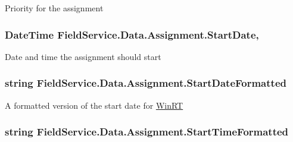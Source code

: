 Priority for the assignment 

\hypertarget{class_field_service_1_1_data_1_1_assignment_a1760d94888dee49e2e13aac039540d23}{
\subsubsection[{Start\+Date}]{\setlength{\rightskip}{0pt plus 5cm}Date\+Time Field\+Service.\+Data.\+Assignment.\+Start\+Date\hspace{0.3cm}{\ttfamily [get]}, {\ttfamily [set]}}}\label{class_field_service_1_1_data_1_1_assignment_a1760d94888dee49e2e13aac039540d23}


Date and time the assignment should start 

\hypertarget{class_field_service_1_1_data_1_1_assignment_a84d7b88bc21fba7b77d0f3924ae66c32}{
\subsubsection[{Start\+Date\+Formatted}]{\setlength{\rightskip}{0pt plus 5cm}string Field\+Service.\+Data.\+Assignment.\+Start\+Date\+Formatted\hspace{0.3cm}{\ttfamily [get]}}}\label{class_field_service_1_1_data_1_1_assignment_a84d7b88bc21fba7b77d0f3924ae66c32}


A formatted version of the start date for \hyperlink{namespace_field_service_1_1_win_r_t}{Win\+R\+T} 

\hypertarget{class_field_service_1_1_data_1_1_assignment_a02c811e84c8dd8876e6e0a9b4f4981d2}{
\subsubsection[{Start\+Time\+Formatted}]{\setlength{\rightskip}{0pt plus 5cm}string Field\+Service.\+Data.\+Assignment.\+Start\+Time\+Formatted\hspace{0.3cm}{\ttfamily [get]}}}\label{class_field_service_1_1_data_1_1_assignment_a02c811e84c8dd8876e6e0a9b4f4981d2}


